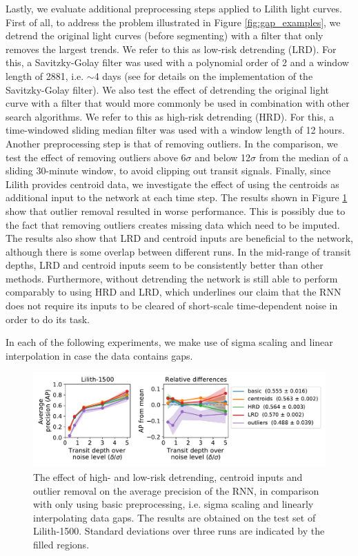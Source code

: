 Lastly, we evaluate additional preprocessing steps applied to Lilith light curves. First of all, to address the problem illustrated in Figure \ref{fig:gap_examples}, we detrend the original light curves (before segmenting) with a filter that only removes the largest trends. We refer to this as low-risk detrending (LRD). For this, a Savitzky-Golay filter was used with a polynomial order of 2 and a window length of 2881, i.e. $\sim$4 days (see \citealp{hippke2019wotan} for details on the implementation of the Savitzky-Golay filter). We also test the effect of detrending the original light curve with a filter that would more commonly be used in combination with other search algorithms. We refer to this as high-risk detrending (HRD). For this, a time-windowed sliding median filter was used with a window length of 12 hours. Another preprocessing step is that of removing outliers. In the comparison, we test the effect of removing outliers above 6$\sigma$ and below 12$\sigma$ from the median of a sliding 30-minute window, to avoid clipping out transit signals. Finally, since Lilith provides centroid data, we investigate the effect of using the centroids as additional input to the network at each time step. The results shown in Figure \ref{fig:lilith_pp_advanced} show that outlier removal resulted in worse performance. This is possibly due to the fact that removing outliers creates missing data which need to be imputed. The results also show that LRD and centroid inputs are beneficial to the network, although there is some overlap between different runs. In the mid-range of transit depths, LRD and centroid inputs seem to be consistently better than other methods. Furthermore, without detrending the network is still able to perform comparably to using HRD and LRD, which underlines our claim that the RNN does not require its inputs to be cleared of short-scale time-dependent noise in order to do its task.

In each of the following experiments, we make use of sigma scaling and linear interpolation in case the data contains gaps.
\begin{figure}
    \centering
    \includegraphics[width=0.79\linewidth]{Experiments/Figures/Preprocessing/lilith1500_AP_pp-advanced.pdf}
    \caption{The effect of high- and low-risk detrending, centroid inputs and outlier removal on the average precision of the RNN, in comparison with only using basic preprocessing, i.e. sigma scaling and linearly interpolating data gaps. The results are obtained on the test set of Lilith-1500. Standard deviations over three runs are indicated by the filled regions.}
    \label{fig:lilith_pp_advanced}
\end{figure}
